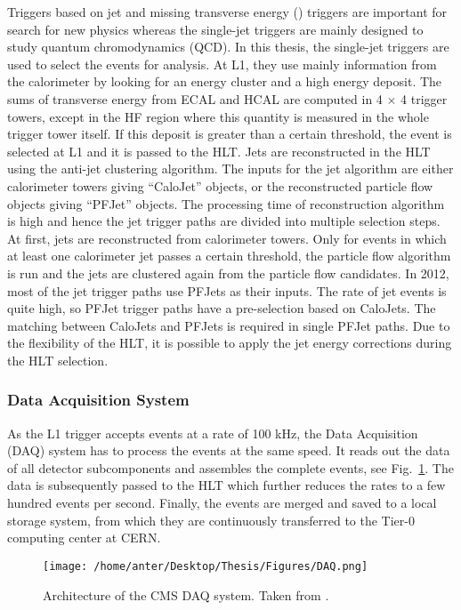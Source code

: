 Triggers based on jet and missing transverse energy (\ETmiss) triggers are important for search for new physics whereas the single-jet triggers are mainly designed to study quantum chromodynamics (QCD). In this thesis, the single-jet triggers are used to select the events for analysis. At L1, they use mainly information from the calorimeter by looking for an energy cluster and a high energy deposit. The sums of transverse energy from ECAL and HCAL are computed in 4 $\times$ 4 trigger towers, except in the HF region where this quantity is measured in the whole trigger tower itself. If this deposit is greater than a certain threshold, the event is selected at L1 and it is passed to the HLT. Jets are reconstructed in the HLT using the anti-\kt jet clustering algorithm. The inputs for the jet algorithm are either calorimeter towers giving ``CaloJet'' objects, or the reconstructed particle flow objects giving ``PFJet'' objects. The processing time of reconstruction algorithm is high and hence the jet trigger paths are divided into multiple selection steps. At first, jets are reconstructed from calorimeter towers. Only for events in which at least one calorimeter jet passes a certain \pt threshold, the particle flow algorithm is run and the jets are clustered again from the particle flow candidates. In 2012, most of the jet trigger paths use PFJets as their inputs. The rate of jet events is quite high, so PFJet trigger paths have a pre-selection based on CaloJets. The matching between CaloJets and PFJets is required in single PFJet paths. Due to the flexibility of the HLT, it is possible to apply the jet energy corrections during the HLT selection.

\subsubsection{Data Acquisition System}
As the L1 trigger accepts events at a rate of 100 kHz, the Data Acquisition (DAQ) system has to process the events at the same speed. It reads out the data of all detector subcomponents and assembles the complete events, see Fig.~\ref{fig:DAQ}. The data is subsequently passed to the HLT which further reduces the rates to a few hundred events per second. Finally, the events are merged and saved to a local storage system, from which they are continuously transferred to the Tier-0 computing center at CERN.

\begin{figure}[!h]
\begin{center}
\vspace*{3mm} 
\hspace*{-5mm}
\texttt{[image: /home/anter/Desktop/Thesis/Figures/DAQ.png]}\\
\vspace*{4mm}
\caption{Architecture of the CMS DAQ system. Taken from \cite{Chatrchyan:2008aa}.}
\label{fig:DAQ}
\end{center}
\end{figure}


